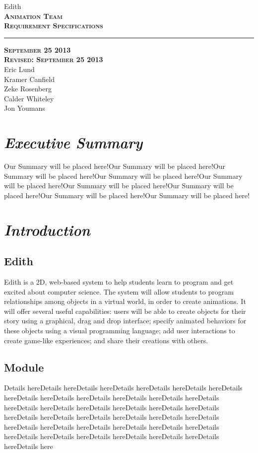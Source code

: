 \documentclass[12pt]{article}
\begin{document}
\begin{titlepage}
	\begin{center}
	\huge  Edith \\
	\vspace*{\fill}%
 	\huge \textsc{\textbf{Animation Team \\Requirement Specifications} }	
	\bigskip 
	\rule{130mm}{.1pt}
	\textsc{\textbf{September 25 2013 \\ Revised: September 25 2013} \\ }	
	\vspace*{\fill}%
	Eric Lund \\
	Kramer Canfield \\ 
	Zeke Rosenberg \\
	Calder Whiteley \\
	Jon Youmans
	\end{center}
	\end{titlepage}


\section{\emph{Executive Summary}}
Our Summary will be placed here!Our Summary will be placed here!Our Summary will be placed here!Our Summary will be placed here!Our Summary will be placed here!Our Summary will be placed here!Our Summary will be placed here!Our Summary will be placed here!Our Summary will be placed here!


\section{\emph{Introduction}}%
	\subsection{Edith}
         Edith is a 2D, web-based system to help students learn to program and get excited about computer science. The system will allow students to program relationships among objects in a virtual world, in order to create animations. It will offer several useful capabilities: users will be able to create objects for their story using a graphical, drag and drop interface; specify animated behaviors for these objects using a visual programming language; add user interactions to create game-like experiences; and share their creations with others. 
	\subsection{Module}
	Details hereDetails hereDetails hereDetails hereDetails hereDetails hereDetails hereDetails hereDetails hereDetails hereDetails hereDetails hereDetails hereDetails hereDetails hereDetails hereDetails hereDetails hereDetails hereDetails hereDetails hereDetails hereDetails hereDetails hereDetails hereDetails hereDetails hereDetails hereDetails hereDetails hereDetails hereDetails hereDetails hereDetails hereDetails hereDetails hereDetails hereDetails here
\end{document}
